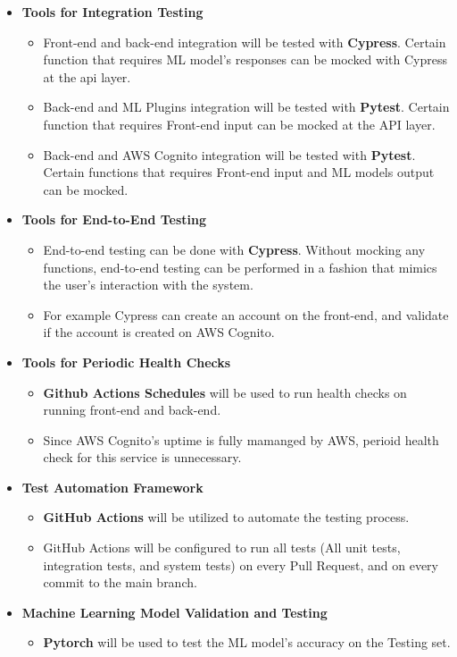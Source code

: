 \documentclass[12pt, titlepage]{article}
\begin{document}
\begin{itemize}
  \item{\textbf{Tools for Integration Testing}}
  \begin{itemize}
    \item{Front-end and back-end integration will be tested with \textbf{Cypress}. Certain function that requires ML model's responses can be mocked with Cypress at the api layer.}
    \item{Back-end and ML Plugins integration will be tested with \textbf{Pytest}. Certain function that requires Front-end input can be mocked at the API layer.}
    \item{Back-end and AWS Cognito integration will be tested with \textbf{Pytest}. Certain functions that requires Front-end input and ML models output can be mocked.}
  \end{itemize}

  \item{\textbf{Tools for End-to-End Testing}}
  \begin{itemize}
    \item{End-to-end testing can be done with \textbf{Cypress}. Without mocking any functions, end-to-end testing can be performed in a fashion that mimics the user's interaction with the system.}
    \item{For example Cypress can create an account on the front-end, and validate if the account is created on AWS Cognito.}
  \end{itemize}

  \item{\textbf{Tools for Periodic Health Checks}}
  \begin{itemize}
    \item{\textbf{Github Actions Schedules} will be used to run health checks on running front-end and back-end.}
    \item{Since AWS Cognito's uptime is fully mamanged by AWS, perioid health check for this service is unnecessary.}
  \end{itemize}

  \item{\textbf{Test Automation Framework}}
  \begin{itemize}
    \item{\textbf{GitHub Actions} will be utilized to automate the testing process.}
    \item{GitHub Actions will be configured to run all tests (All unit tests, integration tests, and system tests) on every Pull Request, and on every commit to the main branch.}
  \end{itemize}

  \item{\textbf{Machine Learning Model Validation and Testing}}
  \begin{itemize}
    \item{\textbf{Pytorch} will be used to test the ML model's accuracy on the Testing set.}
  \end{itemize}
\end{itemize}
\end{document}
